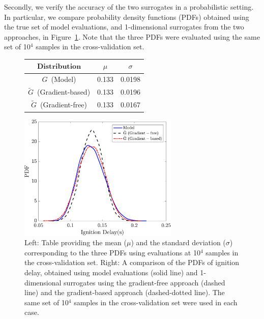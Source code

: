 Secondly, we verify the accuracy of the two surrogates in a probabilistic setting. In particular, we compare 
probability density functions (PDFs) obtained using the true set of model evaluations, and 1-dimensional
surrogates from the two approaches, in Figure~\ref{fig:pdf_33D}. Note that the three PDFs were evaluated 
using the same set of 10$^4$ samples in the cross-validation set. 
%
\begin{figure}[htbp]
\begin{center}
\begin{minipage}[htbp]{.25\linewidth}
\vspace{0pt}
\hspace{-25mm}
\begin{tabular}{ccc}
\toprule
$\textbf{Distribution}$ & $\mu$ & $\sigma$ \\ 
\bottomrule
$G$~(Model) & 0.133 & 0.0198 \\
$\tilde{G}$~(Gradient-based) & 0.133 & 0.0196 \\
$\tilde{G}$~(Gradient-free) & 0.133 & 0.0167 \\
\bottomrule
\end{tabular}
\end{minipage}
\hspace{5mm}
\begin{minipage}[htbp]{.25\linewidth}
\vspace{0pt}
\includegraphics[width=3.0in]{./Figures/pdf_comp_id_1e4}
\end{minipage}%
\end{center} 
\caption{Left: Table providing the mean ($\mu$) and the standard deviation ($\sigma$) corresponding to
the three PDFs using evaluations
at 10$^4$ samples in the cross-validation set. Right: A comparison of the PDFs of ignition delay, obtained using model 
evaluations (solid line) and 1-dimensional surrogates using the gradient-free approach (dashed line) and the gradient-based
approach (dashed-dotted line). The same set of 10$^4$ samples in the cross-validation set were used in each case.}
\label{fig:pdf_33D}
\end{figure}
